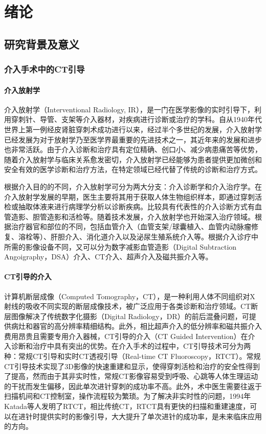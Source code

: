
\chapter{绪论}

\section{研究背景及意义}
\subsection{介入手术中的CT引导}
\subsubsection{介入放射学}
介入放射学（Interventional Radiology, IR），是一门在医学影像的实时引导下，利用穿刺针、导管、支架等介入器材，对疾病进行诊断或治疗的学科\cite{TengGaoJunJieRuZhiLiaoXue2022}。自从1940年代世界上第一例经皮肾脏穿刺术成功进行以来，经过半个多世纪的发展，介入放射学已经发展为对于放射学乃至医学界最重要的先进技术之一，其近年来的发展和进步也非常活跃\cite{HuXiaoKunZhangFuJunXiaoYueYongCTJieRuZhiLiaoXue2020}。由于介入诊断和治疗具有定位精确、创口小、减少病患痛苦等优势，随着介入放射学与临床关系愈发密切，介入放射学已经能够为患者提供更加微创和安全有效的医学诊断和治疗方法，在特定领域已经代替了传统的诊断和治疗方式。

根据介入目的的不同，介入放射学可分为两大分支：介入诊断学和介入治疗学。在介入放射学发展的早期，医生主要将其用于获取人体生物组织样本，即通过穿刺活检或抽取体液来进行病理学分析以诊断疾病。比较具有代表性的介入诊断方式有血管造影、胆管造影和活检等。随着技术发展，介入放射学也开始深入治疗领域。根据治疗器官和部位的不同，包括血管介入（血管支架/球囊植入、血管内动脉瘤修复、溶栓等）、肝胆介入、消化道介入以及泌尿生殖系统介入等。根据介入诊疗中所需的影像设备不同，又可以分为数字减影血管造影（Digital Subtraction Angoigraphy，DSA）介入、CT介入、超声介入及磁共振介入等。

\subsubsection{CT引导的介入}
计算机断层成像（Computed Tomography，CT），是一种利用人体不同组织对X射线的吸收不同实现的断层成像技术，被广泛应用于各类诊断和治疗领域。CT断层图像解决了传统数字化摄影（Digital Radiology，DR）的前后混叠问题，可提供病灶和器官的高分辨率精细结构。此外，相比超声介入的低分辨率和磁共振介入费用昂贵且需要专用介入器械，CT引导的介入（CT Guided Intervention）在介入诊断和治疗中具有突出的优势。在介入手术的过程中，CT引导技术可分为两种：常规CT引导和实时CT透视引导（Real-time CT Fluoroscopy，RTCT）。常规CT引导技术实现了3D影像的快速重建和显示，使得穿刺活检和治疗的安全性得到了提高，然而由于其非实时性，常规CT影像容易受到呼吸、心跳等人体生理运动的干扰而发生偏移，因此单次进针穿刺的成功率不高。此外，术中医生需要往返于扫描机间和CT控制室，操作流程较为繁琐。为了解决非实时性的问题，1994年Katada等人发明了RTCT，相比传统CT，RTCT具有更快的扫描和重建速度，可以在进针时提供实时的影像引导，大大提升了单次进针的成功率，是未来临床应用的方向\cite{HuXiaoKunZhangFuJunXiaoYueYongCTJieRuZhiLiaoXue2020,katadaDevelopmentRealtimeCT1994}。

